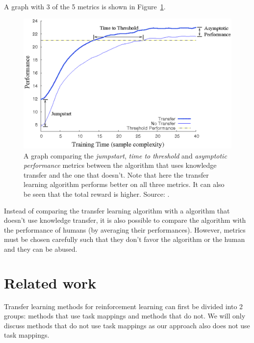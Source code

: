 A graph with 3 of the 5 metrics is shown in Figure~\ref{fig:TLmetrics}.
\begin{figure}[htb]
    \centering
    \includegraphics[width=.9\linewidth]{images/tlmetrics.png}
    \caption[Transfer learning metrics]{A graph comparing the \textit{jumpstart}, \textit{time to threshold} and \textit{asymptotic performance} metrics between the algorithm that uses knowledge transfer and the one that doesn't. Note that here the transfer learning algorithm performs better on all three metrics. It can also be seen that the total reward is higher. Source: \cite{Taylor2009TransferSurvey}.}
    \label{fig:TLmetrics}
\end{figure}
Instead of comparing the transfer learning algorithm with a algorithm that doesn't use knowledge transfer, it is also possible to compare the algorithm with the performance of humans (by averaging their performances). However, metrics must be chosen carefully such that they don't favor the algorithm or the human and they can be abused.

\section{Related work}




Transfer learning methods for reinforcement learning can first be divided into 2 groups: methods that use task mappings and methods that do not. We will only discuss methods that do not use task mappings as our approach also does not use task mappings.\\

